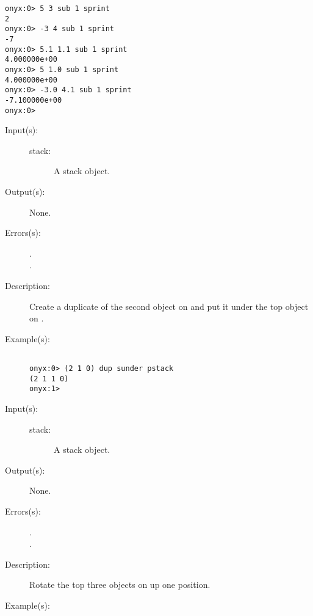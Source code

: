 \begin{description}
\begin{description}
\begin{verbatim}
onyx:0> 5 3 sub 1 sprint
2
onyx:0> -3 4 sub 1 sprint
-7
onyx:0> 5.1 1.1 sub 1 sprint
4.000000e+00
onyx:0> 5 1.0 sub 1 sprint
4.000000e+00
onyx:0> -3.0 4.1 sub 1 sprint
-7.100000e+00
onyx:0>
		\end{verbatim}
	\end{description}
\label{systemdict:sunder}
\item[{\onyxop{stack}{sunder}{--}}: ]
	\begin{description}\item[]
	\item[Input(s): ]
		\begin{description}\item[]
		\item[stack: ]
			A stack object.
		\end{description}
	\item[Output(s): ] None.
	\item[Errors(s): ]
		\begin{description}\item[]
		\item[.]
		\item[.]
		\end{description}
	\item[Description: ]
		Create a duplicate of the second object on  and put
		it under the top object on .
	\item[Example(s): ]\begin{verbatim}

onyx:0> (2 1 0) dup sunder pstack
(2 1 1 0)
onyx:1>
		\end{verbatim}
	\end{description}
\label{systemdict:sup}
\item[{\onyxop{stack}{sup}{--}}: ]
	\begin{description}\item[]
	\item[Input(s): ]
		\begin{description}\item[]
		\item[stack: ]
			A stack object.
		\end{description}
	\item[Output(s): ] None.
	\item[Errors(s): ]
		\begin{description}\item[]
		\item[.]
		\item[.]
		\end{description}
	\item[Description: ]
		Rotate the top three objects on  up one position.
	\item[Example(s): ]\begin{verbatim}


\end{verbatim}
\end{description}
\end{description}
